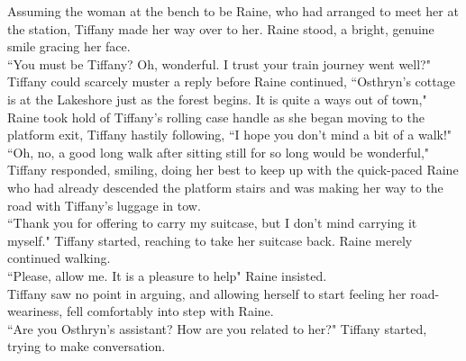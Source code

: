 Assuming the woman at the bench to be Raine, who had arranged to meet her at the station, Tiffany made her way over to her.
Raine stood, a bright, genuine smile gracing her face.\\
``You must be Tiffany? Oh, wonderful. I trust your train journey went well?"\\
Tiffany could scarcely muster a reply before Raine continued, ``Osthryn's cottage is at the Lakeshore just as the forest begins. It is quite a ways out of town," Raine took hold of Tiffany's rolling case handle as she began moving to the platform exit, Tiffany hastily following, ``I hope you don't mind a bit of a walk!"\\
``Oh, no, a good long walk after sitting still for so long would be wonderful," Tiffany responded, smiling, doing her best to keep up with the quick-paced Raine who had already descended the platform stairs and was making her way to the road with Tiffany's luggage in tow.\\

``Thank you for offering to carry my suitcase, but I don't mind carrying it myself." Tiffany started, reaching to take her suitcase back. 
Raine merely continued walking.\\
``Please, allow me. It is a pleasure to help" Raine insisted.\\
Tiffany saw no point in arguing, and allowing herself to start feeling her road-weariness, fell comfortably into step with Raine.\\
``Are you Osthryn's assistant? How are you related to her?" Tiffany started, trying to make conversation.\\

